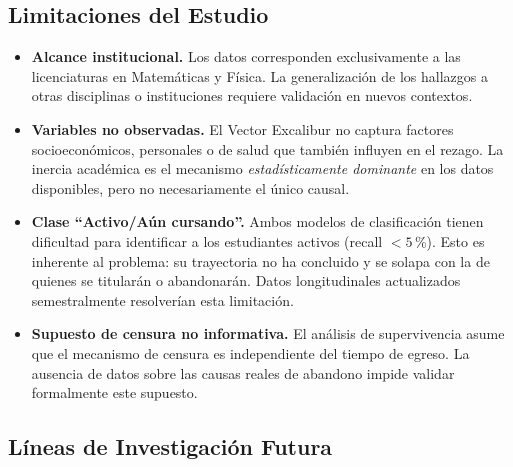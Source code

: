 \subsection{Limitaciones del Estudio}

\begin{itemize}
    \item \textbf{Alcance institucional.} Los datos corresponden exclusivamente a las
          licenciaturas en Matemáticas y Física. La generalización de los hallazgos a otras
          disciplinas o instituciones requiere validación en nuevos contextos.

    \item \textbf{Variables no observadas.} El Vector Excalibur no captura factores
          socioeconómicos, personales o de salud que también influyen en el rezago. La
          inercia académica es el mecanismo \emph{estadísticamente dominante} en los datos
          disponibles, pero no necesariamente el único causal.

    \item \textbf{Clase ``Activo/Aún cursando''.} Ambos modelos de clasificación tienen
          dificultad para identificar a los estudiantes activos (recall $< 5\,\%$). Esto es
          inherente al problema: su trayectoria no ha concluido y se solapa con la de quienes
          se titularán o abandonarán. Datos longitudinales actualizados semestralmente
          resolverían esta limitación.

    \item \textbf{Supuesto de censura no informativa.} El análisis de supervivencia asume
          que el mecanismo de censura es independiente del tiempo de egreso. La ausencia de
          datos sobre las causas reales de abandono impide validar formalmente este supuesto.
\end{itemize}

\subsection{Líneas de Investigación Futura}

